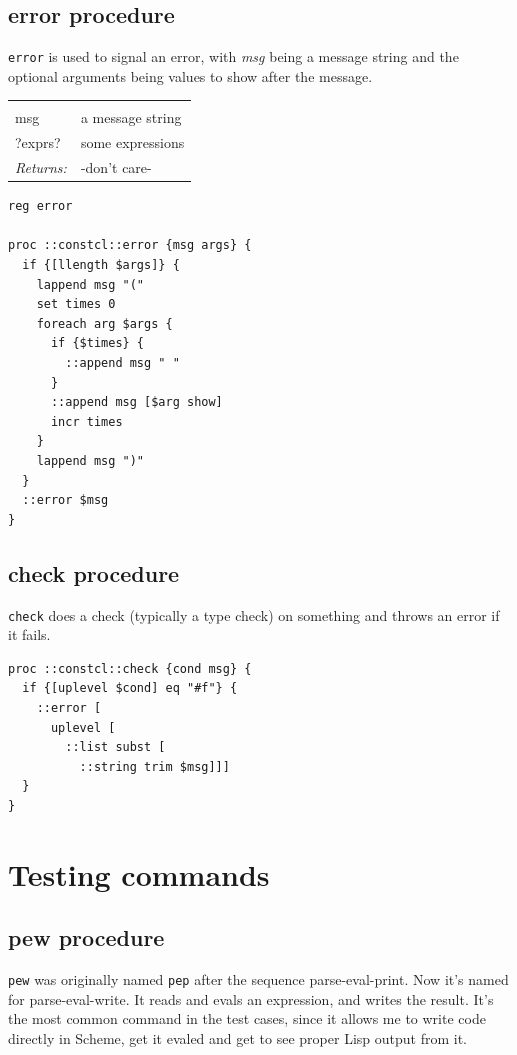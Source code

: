 \documentclass[twoside,9pt]{report}
\begin{document}
\subsection{error procedure}
\label{error-procedure}


\texttt{error} is used to signal an error, with \emph{msg} being a message string and the optional arguments being values to show after the message.

\noindent\begin{tabular}{ |p{1.9cm} p{8cm}| }
\hline
\rowcolor[HTML]{CCCCCC} \multicolumn{2}{|l|}{\bf error (public)} \\
msg & a message string \\
?exprs? & some expressions \\
\textit{Returns:} & -don't care- \\
\hline
\end{tabular}
\begin{lstlisting}
reg error

proc ::constcl::error {msg args} {
  if {[llength $args]} {
    lappend msg "("
    set times 0
    foreach arg $args {
      if {$times} {
        ::append msg " "
      }
      ::append msg [$arg show]
      incr times
    }
    lappend msg ")"
  }
  ::error $msg
}
\end{lstlisting}
\subsection{check procedure}
\label{check-procedure}


\texttt{check} does a check (typically a type check) on something and throws an error if it fails.

\begin{lstlisting}
proc ::constcl::check {cond msg} {
  if {[uplevel $cond] eq "#f"} {
    ::error [
      uplevel [
        ::list subst [
          ::string trim $msg]]]
  }
}
\end{lstlisting}
\section{Testing commands}
\label{testing-commands}
\subsection{pew procedure}
\label{pew-procedure}


\texttt{pew} was originally named \texttt{pep} after the sequence parse-eval-print. Now it's named for parse-eval-write. It reads and evals an expression, and writes the result. It's the most common command in the test cases, since it allows me to write code directly in Scheme, get it evaled and get to see proper Lisp output from it.
\end{document}
